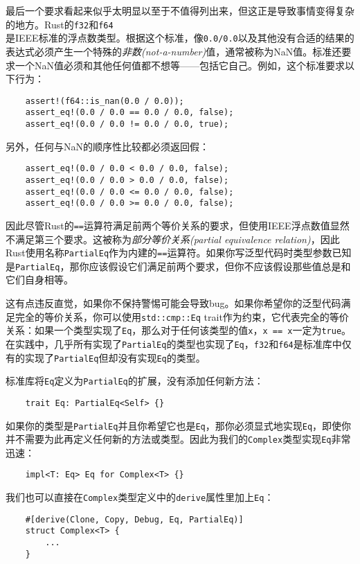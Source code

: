 最后一个要求看起来似乎太明显以至于不值得列出来，但这正是导致事情变得复杂的地方。Rust的\texttt{f32}和\texttt{f64}\\
是IEEE标准的浮点数类型。根据这个标准，像\texttt{0.0/0.0}以及其他没有合适的结果的表达式必须产生一个特殊的\emph{非数(not-a-number)}值，通常被称为NaN值。标准还要求一个NaN值必须和其他任何值都不想等——包括它自己。例如，这个标准要求以下行为：
\begin{verbatim}
    assert!(f64::is_nan(0.0 / 0.0));
    assert_eq!(0.0 / 0.0 == 0.0 / 0.0, false);
    assert_eq!(0.0 / 0.0 != 0.0 / 0.0, true);
\end{verbatim}

另外，任何与NaN的顺序性比较都必须返回假：
\begin{verbatim}
    assert_eq!(0.0 / 0.0 < 0.0 / 0.0, false);
    assert_eq!(0.0 / 0.0 > 0.0 / 0.0, false);
    assert_eq!(0.0 / 0.0 <= 0.0 / 0.0, false);
    assert_eq!(0.0 / 0.0 >= 0.0 / 0.0, false);
\end{verbatim}

因此尽管Rust的\texttt{==}运算符满足前两个等价关系的要求，但使用IEEE浮点数值显然不满足第三个要求。这被称为\emph{部分等价关系(partial equivalence relation)}，因此Rust使用名称\texttt{PartialEq}作为内建的\texttt{==}运算符。如果你写泛型代码时类型参数已知是\texttt{PartialEq}，那你应该假设它们满足前两个要求，但你不应该假设那些值总是和它们自身相等。

这有点违反直觉，如果你不保持警惕可能会导致bug。如果你希望你的泛型代码满足完全的等价关系，你可以使用\texttt{std::cmp::Eq} trait作为约束，它代表完全的等价关系：如果一个类型实现了\texttt{Eq}，那么对于任何该类型的值\texttt{x}，\texttt{x == x}一定为\texttt{true}。在实践中，几乎所有实现了\texttt{PartialEq}的类型也实现了\texttt{Eq}，\texttt{f32}和\texttt{f64}是标准库中仅有的实现了\texttt{PartialEq}但却没有实现\texttt{Eq}的类型。

标准库将\texttt{Eq}定义为\texttt{PartialEq}的扩展，没有添加任何新方法：
\begin{verbatim}
    trait Eq: PartialEq<Self> {}
\end{verbatim}

如果你的类型是\texttt{PartialEq}并且你希望它也是\texttt{Eq}，那你必须显式地实现\texttt{Eq}，即使你并不需要为此再定义任何新的方法或类型。因此为我们的\texttt{Complex}类型实现\texttt{Eq}非常迅速：
\begin{verbatim}
    impl<T: Eq> Eq for Complex<T> {}
\end{verbatim}

我们也可以直接在\texttt{Complex}类型定义中的\texttt{derive}属性里加上\texttt{Eq}：
\begin{verbatim}
    #[derive(Clone, Copy, Debug, Eq, PartialEq)]
    struct Complex<T> {
        ...
    }
\end{verbatim}

